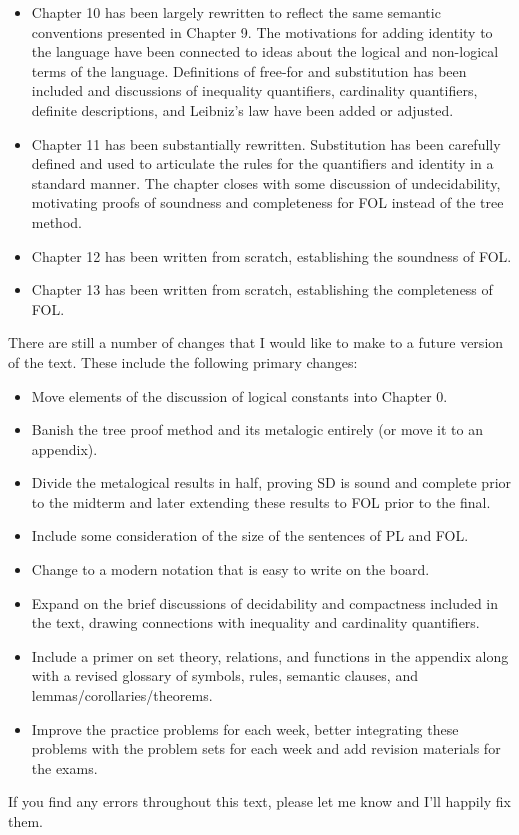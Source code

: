 \begin{itemize}
  \item Chapter 10 has been largely rewritten to reflect the same semantic conventions presented in Chapter 9. The motivations for adding identity to the language have been connected to ideas about the logical and non-logical terms of the language. Definitions of free-for and substitution has been included and discussions of inequality quantifiers, cardinality quantifiers, definite descriptions, and Leibniz's law have been added or adjusted.
  \item Chapter 11 has been substantially rewritten. Substitution has been carefully defined and used to articulate the rules for the quantifiers and identity in a standard manner. The chapter closes with some discussion of undecidability, motivating proofs of soundness and completeness for FOL instead of the tree method.
  \item Chapter 12 has been written from scratch, establishing the soundness of FOL.
  \item Chapter 13 has been written from scratch, establishing the completeness of FOL.
\end{itemize}

There are still a number of changes that I would like to make to a future version of the text.
These include the following primary changes:
  \begin{itemize}
    \item Move elements of the discussion of logical constants into Chapter 0.
    \item Banish the tree proof method and its metalogic entirely (or move it to an appendix).
    \item Divide the metalogical results in half, proving SD is sound and complete prior to the midterm and later extending these results to FOL prior to the final.
    \item Include some consideration of the size of the sentences of PL and FOL.
    \item Change to a modern notation that is easy to write on the board. %
    \item Expand on the brief discussions of decidability and compactness included in the text, drawing connections with inequality and cardinality quantifiers.
    \item Include a primer on set theory, relations, and functions in the appendix along with a revised glossary of symbols, rules, semantic clauses, and lemmas/corollaries/theorems.
    \item Improve the practice problems for each week, better integrating these problems with the problem sets for each week and add revision materials for the exams.
  \end{itemize}
If you find any errors throughout this text, please let me know and I'll happily fix them.

